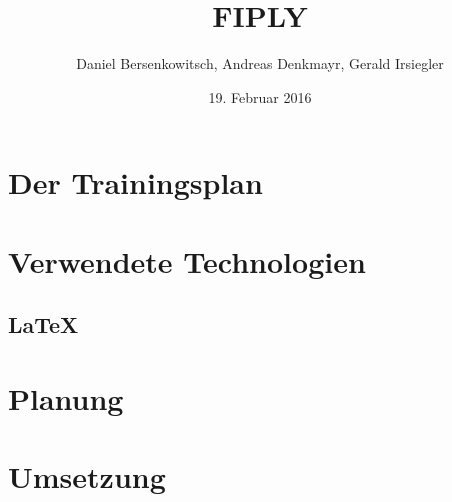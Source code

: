 \documentclass[a4paper, 12pt]{article}
\title{FIPLY}
\author{Daniel Bersenkowitsch, Andreas Denkmayr, Gerald Irsiegler}
\date{19. Februar 2016}
\begin{document}
\maketitle
\tableofcontents
\newpage

\newpage

\newpage

\newpage

\newpage


\newpage %


\newpage %
\section{Der Trainingsplan}


\newpage %
\section{Verwendete Technologien}

\newpage


\newpage
\subsection{LaTeX}







\newpage %
\section{Planung}

\newpage



\newpage %
\section{Umsetzung}

\newpage

\newpage

\newpage

\newpage

\newpage

\newpage

%
\newpage

\newpage

\newpage

\newpage

\newpage

\newpage
%
%
\end{document}
